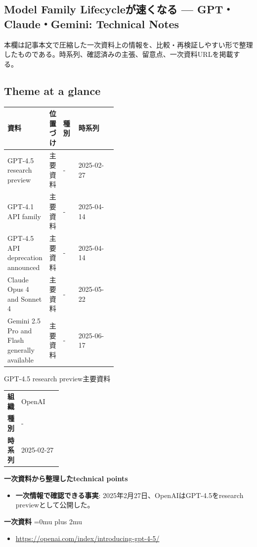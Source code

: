\subsection*{Model Family Lifecycleが速くなる — GPT・Claude・Gemini: Technical Notes}
本欄は記事本文で圧縮した一次資料上の情報を、比較・再検証しやすい形で整理したものである。時系列、確認済みの主張、留意点、一次資料URLを掲載する。
\medskip
\subsection*{Theme at a glance}
\begin{center}
\footnotesize
\begin{tabularx}{\linewidth}{@{}p{0.20\linewidth}p{0.10\linewidth}p{0.14\linewidth}X@{}}
\toprule
資料 & 位置づけ & 種別 & 時系列 \\
\midrule
GPT-4.5 research preview & 主要資料 & - & 2025-02-27   \\
GPT-4.1 API family & 主要資料 & - & 2025-04-14   \\
GPT-4.5 API deprecation announced & 主要資料 & - & 2025-04-14   \\
Claude Opus 4 and Sonnet 4 & 主要資料 & - & 2025-05-22   \\
Gemini 2.5 Pro and Flash generally available & 主要資料 & - & 2025-06-17   \\
\bottomrule
\end{tabularx}
\end{center}
\normalsize

\begin{technicalnote}{GPT-4.5 research preview}{主要資料}
\begingroup
\begin{tabularx}{\linewidth}{@{}>{\bfseries}p{0.22\linewidth}X@{}}
組織 & OpenAI \\
種別 & - \\
時系列 & 2025-02-27 \\
\end{tabularx}
\smallskip
{\bfseries 一次資料から整理したtechnical points}
\begin{itemize}[leftmargin=1.5em,itemsep=0.35em]
\item \textbf{一次情報で確認できる事実}: 2025年2月27日、OpenAIはGPT-4.5をresearch previewとして公開した。
\end{itemize}
\begin{samepage}
{\bfseries 一次資料}
\begingroup\sloppy
\Urlmuskip=0mu plus 2mu\relax
\begin{itemize}[leftmargin=1.5em,itemsep=0.25em]
\item {\scriptsize\url{https://openai.com/index/introducing-gpt-4-5/}}
\end{itemize}
\endgroup
\end{samepage}
\endgroup
\end{technicalnote}
\medskip

